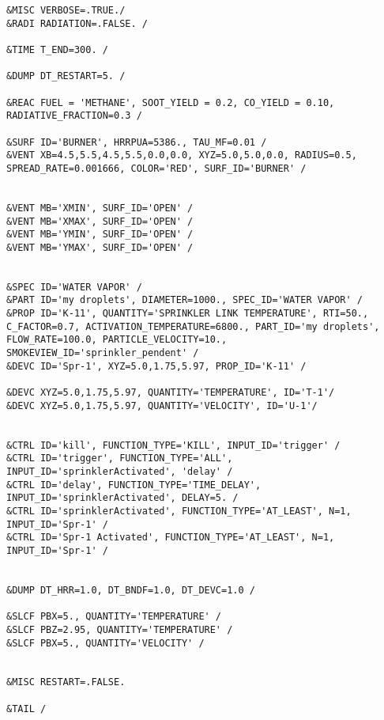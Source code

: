 \begin{lstlisting}[emptylines=0,basicstyle=\tiny]
&MISC VERBOSE=.TRUE./
&RADI RADIATION=.FALSE. /

&TIME T_END=300. /

&DUMP DT_RESTART=5. /

&REAC FUEL = 'METHANE', SOOT_YIELD = 0.2, CO_YIELD = 0.10, RADIATIVE_FRACTION=0.3 /

&SURF ID='BURNER', HRRPUA=5386., TAU_MF=0.01 /
&VENT XB=4.5,5.5,4.5,5.5,0.0,0.0, XYZ=5.0,5.0,0.0, RADIUS=0.5, SPREAD_RATE=0.001666, COLOR='RED', SURF_ID='BURNER' /


&VENT MB='XMIN', SURF_ID='OPEN' /  
&VENT MB='XMAX', SURF_ID='OPEN' /  
&VENT MB='YMIN', SURF_ID='OPEN' /  
&VENT MB='YMAX', SURF_ID='OPEN' / 

 
&SPEC ID='WATER VAPOR' /
&PART ID='my droplets', DIAMETER=1000., SPEC_ID='WATER VAPOR' /
&PROP ID='K-11', QUANTITY='SPRINKLER LINK TEMPERATURE', RTI=50., C_FACTOR=0.7, ACTIVATION_TEMPERATURE=6800., PART_ID='my droplets', FLOW_RATE=100.0, PARTICLE_VELOCITY=10., SMOKEVIEW_ID='sprinkler_pendent' /
&DEVC ID='Spr-1', XYZ=5.0,1.75,5.97, PROP_ID='K-11' /

&DEVC XYZ=5.0,1.75,5.97, QUANTITY='TEMPERATURE', ID='T-1'/
&DEVC XYZ=5.0,1.75,5.97, QUANTITY='VELOCITY', ID='U-1'/


&CTRL ID='kill', FUNCTION_TYPE='KILL', INPUT_ID='trigger' /
&CTRL ID='trigger', FUNCTION_TYPE='ALL', INPUT_ID='sprinklerActivated', 'delay' /
&CTRL ID='delay', FUNCTION_TYPE='TIME_DELAY', INPUT_ID='sprinklerActivated', DELAY=5. /
&CTRL ID='sprinklerActivated', FUNCTION_TYPE='AT_LEAST', N=1, INPUT_ID='Spr-1' /
&CTRL ID='Spr-1 Activated', FUNCTION_TYPE='AT_LEAST', N=1, INPUT_ID='Spr-1' /


&DUMP DT_HRR=1.0, DT_BNDF=1.0, DT_DEVC=1.0 /

&SLCF PBX=5., QUANTITY='TEMPERATURE' /
&SLCF PBZ=2.95, QUANTITY='TEMPERATURE' /
&SLCF PBX=5., QUANTITY='VELOCITY' /


&MISC RESTART=.FALSE.

&TAIL /


\end{lstlisting}

